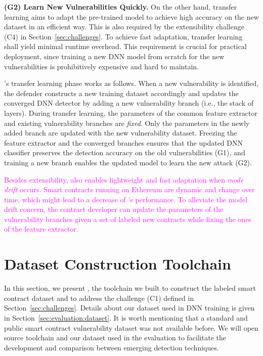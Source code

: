\vspace{0.1em}
\textbf{(G2) Learn New Vulnerabilities Quickly.} On the other hand, transfer learning aims to adapt the pre-trained model to achieve high accuracy on the new dataset in an efficient way. 
This is also required by the extensibility challenge (C4) in Section~\ref{sec:challenges}. 
To achieve fast adaptation, transfer learning shall yield minimal runtime overhead. 
This requirement is crucial for practical deployment, since training a new DNN model from scratch for the new vulnerabilities is prohibitively expensive and hard to maintain. 

\sys{}'s transfer learning phase works as follows. 
When a new vulnerability is identified, the defender constructs a new training dataset accordingly and updates the converged DNN detector by adding a new vulnerability branch (i.e., the stack of layers). 
During transfer learning, the parameters of the common feature extractor and existing vulnerability branches are \textit{fixed}. 
Only the parameters in the newly added branch are updated with the new vulnerability dataset. 
Freezing the feature extractor and the converged branches ensures that the updated DNN classifier preserves the detection accuracy on the old vulnerabilities (G1), and training a new branch enables the updated model to learn the new attack (G2).

\textcolor{magenta}{Besides extensibility, \sys{} also enables lightweight and fast adaptation when \textit{mode drift} occurs. Smart contracts running on Ethereum are dynamic and change over time, which might lead to a decrease of \sys{}'s performance. To alleviate the model drift concern, the contract developer can update the parameters of the vulnerability branches given a set of labeled new contracts while fixing the ones of the feature extractor. }\vspace{-0.2em}
\section{Dataset Construction Toolchain}
\label{sec:data}
\vspace{-0.2em}
In this section, we present \datatool{}, the toolchain we built to construct the labeled smart contract dataset and to address the challenge (C1) defined in Section~\ref{sec:challenges}. 
Details about our dataset used in DNN training is given in Section~\ref{sec:evaluation:dataset}. 
It is worth mentioning that a standard and public smart contract vulnerability dataset was not available before. We will open source \datatool{} toolchain and our dataset used in the evaluation to facilitate the development and comparison between emerging detection techniques.

